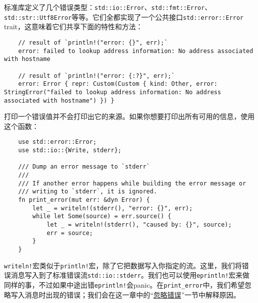 标准库定义了几个错误类型：\texttt{std::io::Error}、\texttt{std::fmt::Error}、\texttt{std::str::Utf8Error}等等。它们全都实现了一个公共接口\texttt{std::error::Error} trait，这意味着它们共享下面的特性和方法：

\begin{verbatim}
    // result of `println!("error: {}", err);`
    error: failed to lookup address information: No address associated with hostname

    // result of `println!("error: {:?}", err);`
    error: Error { repr: Custom(Custom { kind: Other, error: StringError("failed to lookup address information: No address associated with hostname") }) }
\end{verbatim}



打印一个错误值并不会打印出它的来源。如果你想要打印出所有可用的信息，使用这个函数：
\begin{verbatim}
    use std::error::Error;
    use std::io::{Write, stderr};

    /// Dump an error message to `stderr`
    ///
    /// If another error happens while building the error message or
    /// writing to `stderr`, it is ignored.
    fn print_error(mut err: &dyn Error) {
        let _ = writeln!(stderr(), "error: {}", err);
        while let Some(source) = err.source() {
            let _ = writeln!(stderr(), "caused by: {}", source);
            err = source;
        }
    }
\end{verbatim}

\texttt{writeln!}宏类似于\texttt{println!}宏，除了它把数据写入你指定的流。这里，我们将错误消息写入到了标准错误流\texttt{std::io::stderr}。我们也可以使用\texttt{eprintln!}宏来做同样的事，不过如果中途出错\texttt{eprintln!}会panic。在\texttt{print\_error}中，我们希望忽略写入消息时出现的错误；我们会在这一章中的“\hyperref[ignoreerr]{忽略错误}”一节中解释原因。

